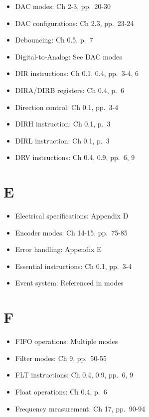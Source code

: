 \documentclass[11pt,a4paper,oneside,english]{book}
\begin{document}
\begin{itemize}
\tightlist
\item
  DAC modes: Ch 2-3, pp.~20-30
\item
  DAC configurations: Ch 2.3, pp.~23-24
\item
  Debouncing: Ch 0.5, p.~7
\item
  Digital-to-Analog: See DAC modes
\item
  DIR instructions: Ch 0.1, 0.4, pp.~3-4, 6
\item
  DIRA/DIRB registers: Ch 0.4, p.~6
\item
  Direction control: Ch 0.1, pp.~3-4
\item
  DIRH instruction: Ch 0.1, p.~3
\item
  DIRL instruction: Ch 0.1, p.~3
\item
  DRV instructions: Ch 0.4, 0.9, pp.~6, 9
\end{itemize}

\hypertarget{e}{%
\section{E}\label{e}}

\begin{itemize}
\tightlist
\item
  Electrical specifications: Appendix D
\item
  Encoder modes: Ch 14-15, pp.~75-85
\item
  Error handling: Appendix E
\item
  Essential instructions: Ch 0.1, pp.~3-4
\item
  Event system: Referenced in modes
\end{itemize}

\hypertarget{f}{%
\section{F}\label{f}}

\begin{itemize}
\tightlist
\item
  FIFO operations: Multiple modes
\item
  Filter modes: Ch 9, pp.~50-55
\item
  FLT instructions: Ch 0.4, 0.9, pp.~6, 9
\item
  Float operations: Ch 0.4, p.~6
\item
  Frequency measurement: Ch 17, pp.~90-94
\end{itemize}
\end{document}
